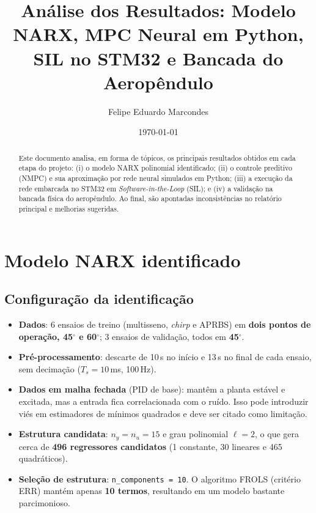 \documentclass[12pt,a4paper]{article}
\title{\textbf{Análise dos Resultados: Modelo NARX, MPC Neural em Python, SIL no STM32 e Bancada do Aeropêndulo}}
\author{Felipe Eduardo Marcondes}
\date{\today}
\newcommand{\graus}{$^\circ$}
\begin{document}
\maketitle

\begin{abstract}
Este documento analisa, em forma de tópicos, os principais resultados obtidos em cada etapa do projeto: (i) o modelo NARX polinomial identificado; (ii) o controle preditivo (NMPC) e sua aproximação por rede neural simulados em Python; (iii) a execução da rede embarcada no STM32 em \textit{Software-in-the-Loop} (SIL); e (iv) a validação na bancada física do aeropêndulo. Ao final, são apontadas inconsistências no relatório principal e melhorias sugeridas.
\end{abstract}

\section{Modelo NARX identificado}

\subsection{Configuração da identificação}
\begin{itemize}
    \item \textbf{Dados}: 6 ensaios de treino (multisseno, \textit{chirp} e APRBS) em \textbf{dois pontos de operação, 45\graus{} e 60\graus{}}; 3 ensaios de validação, todos em \textbf{45\graus{}}.
    \item \textbf{Pré-processamento}: descarte de 10\,s no início e 13\,s no final de cada ensaio, sem decimação ($T_s = 10$\,ms, 100\,Hz).
    \item \textbf{Dados em malha fechada} (PID de base): mantêm a planta estável e excitada, mas a entrada fica correlacionada com o ruído. Isso pode introduzir viés em estimadores de mínimos quadrados e deve ser citado como limitação.
    \item \textbf{Estrutura candidata}: $n_y = n_u = 15$ e grau polinomial $\ell = 2$, o que gera cerca de \textbf{496 regressores candidatos} (1 constante, 30 lineares e 465 quadráticos).
    \item \textbf{Seleção de estrutura}: \texttt{n\_components = 10}. O algoritmo FROLS (critério ERR) mantém apenas \textbf{10 termos}, resultando em um modelo bastante parcimonioso.
\end{itemize}
\end{document}
